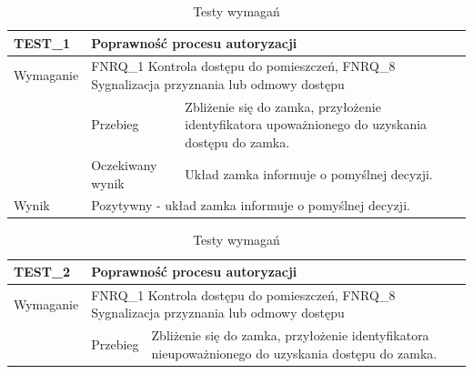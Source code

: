         \begin{table}[h!]
            \caption{Testy wymagań}
            \centering
            \begin{subtable}[c]{\textwidth}
                \centering
                    \begin{tabular}{|p{2cm}|p{}|p{}|}
                    \hline
                    TEST\_1               & \multicolumn{2}{l|}{\textbf{Poprawność procesu autoryzacji}} \\ \hline
                    \cellcolor[gray]{0.8} Wymaganie             & \multicolumn{2}{p{12cm}|}{FNRQ\_1 Kontrola dostępu do pomieszczeń, FNRQ\_8 Sygnalizacja przyznania lub odmowy dostępu} \\ \hline
                    \cellcolor[gray]{0.8} \multirow{2}{*}{Opis} & Przebieg           & Zbliżenie się do zamka, przyłożenie identyfikatora upoważnionego do uzyskania dostępu do zamka. \\ \cline{2-3}
                    \cellcolor[gray]{0.8}                      & Oczekiwany wynik   & Układ zamka informuje o pomyślnej decyzji.                                                 \\ \hline
                    \cellcolor[gray]{0.8} Wynik                 & \multicolumn{2}{p{12cm}|}{Pozytywny - układ zamka informuje o pomyślnej decyzji.}                                                                                  \\ \hline
                    \end{tabular}%
                \label{tbl:test1}
                \vspace{10mm}
            \end{subtable}
        \quad%
            \begin{subtable}[c]{\textwidth}
                \centering
                    \begin{tabular}{|p{2cm}|p{}|p{}|}
                    \hline
                    TEST\_2               & \multicolumn{2}{l|}{\textbf{Poprawność procesu autoryzacji}}                                                            \\ \hline
                    \cellcolor[gray]{0.8} Wymaganie             & \multicolumn{2}{p{12cm}|}{FNRQ\_1 Kontrola dostępu do pomieszczeń, FNRQ\_8 Sygnalizacja przyznania lub odmowy dostępu}                                                                                    \\ \hline
                    \cellcolor[gray]{0.8} \multirow{2}{*}{Opis} & Przebieg           & Zbliżenie się do zamka, przyłożenie identyfikatora nieupoważnionego do uzyskania dostępu do zamka. \\ \cline{2-3}

\end{tabular}
\end{subtable}
\end{table}
